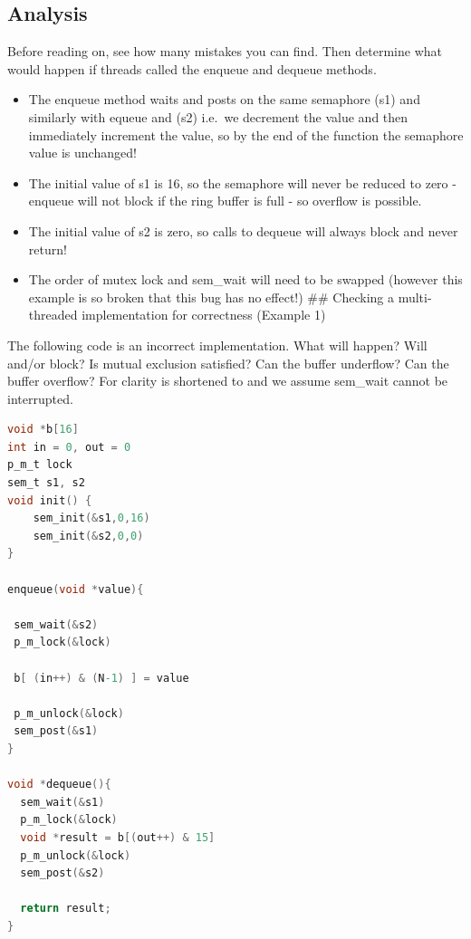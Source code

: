 \subsection{Analysis}\label{analysis}

Before reading on, see how many mistakes you can find. Then determine what would happen if threads called the enqueue and dequeue methods.

\begin{itemize}
\tightlist
\item
  The enqueue method waits and posts on the same semaphore (s1) and similarly with equeue and (s2) i.e.~we decrement the value and then immediately increment the value, so by the end of the function the semaphore value is unchanged!
\item
  The initial value of s1 is 16, so the semaphore will never be reduced to zero - enqueue will not block if the ring buffer is full - so overflow is possible.
\item
  The initial value of s2 is zero, so calls to dequeue will always block and never return!
\item
  The order of mutex lock and sem\_wait will need to be swapped (however this example is so broken that this bug has no effect!) \#\# Checking a multi-threaded implementation for correctness (Example 1)
\end{itemize}

The following code is an incorrect implementation. What will happen? Will  and/or  block? Is mutual exclusion satisfied? Can the buffer underflow? Can the buffer overflow? For clarity  is shortened to  and we assume sem\_wait cannot be interrupted.

\begin{lstlisting}[language=C]
void *b[16]
int in = 0, out = 0
p_m_t lock
sem_t s1, s2
void init() {
    sem_init(&s1,0,16)
    sem_init(&s2,0,0)
}

enqueue(void *value){

 sem_wait(&s2)
 p_m_lock(&lock)

 b[ (in++) & (N-1) ] = value

 p_m_unlock(&lock)
 sem_post(&s1)
}

void *dequeue(){
  sem_wait(&s1)
  p_m_lock(&lock)
  void *result = b[(out++) & 15]
  p_m_unlock(&lock)
  sem_post(&s2)

  return result;
}
\end{lstlisting}


